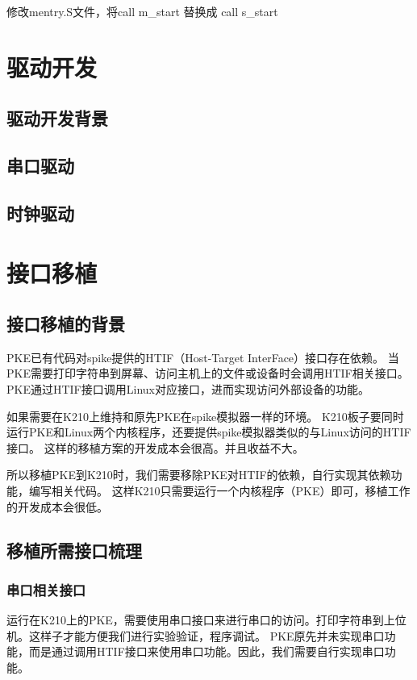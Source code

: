 修改mentry.S文件，将call m\_start 替换成 call s\_start

\section{驱动开发}

\subsection{驱动开发背景}

\subsection{串口驱动}

\subsection{时钟驱动}

\section{接口移植}

\subsection{接口移植的背景}
PKE已有代码对spike提供的HTIF（Host-Target InterFace）接口存在依赖。
当PKE需要打印字符串到屏幕、访问主机上的文件或设备时会调用HTIF相关接口。
PKE通过HTIF接口调用Linux对应接口，进而实现访问外部设备的功能。

如果需要在K210上维持和原先PKE在spike模拟器一样的环境。
K210板子要同时运行PKE和Linux两个内核程序，还要提供spike模拟器类似的与Linux访问的HTIF接口。
这样的移植方案的开发成本会很高。并且收益不大。

所以移植PKE到K210时，我们需要移除PKE对HTIF的依赖，自行实现其依赖功能，编写相关代码。
这样K210只需要运行一个内核程序（PKE）即可，移植工作的开发成本会很低。

\subsection{移植所需接口梳理}

\subsubsection{串口相关接口}
运行在K210上的PKE，需要使用串口接口来进行串口的访问。打印字符串到上位机。这样子才能方便我们进行实验验证，程序调试。
PKE原先并未实现串口功能，而是通过调用HTIF接口来使用串口功能。因此，我们需要自行实现串口功能。

